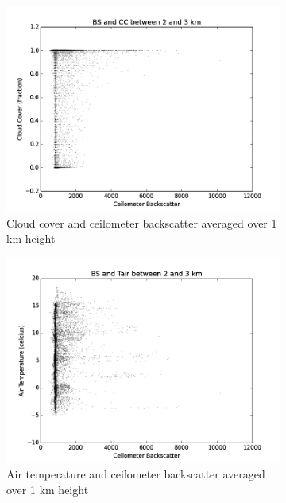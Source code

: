 \documentclass[a4paper,titlepage, twoside]{report}
\begin{document}
\begin{figure}
\centering
\begin{subfigure}{0.48\textwidth}
\includegraphics[width=\textwidth]{BS2_CC.png}
\caption{Cloud cover and ceilometer backscatter averaged over 1 km height}
\end{subfigure}
\hfill
\begin{subfigure}{0.48\textwidth}
\includegraphics[width=\textwidth]{BS2_Tair.png}
\caption{Air temperature and ceilometer backscatter averaged over 1 km height}
\end{subfigure}
\\
\begin{subfigure}{0.48\textwidth}

\end{subfigure}
\end{figure}
\end{document}
